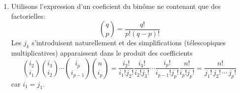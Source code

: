 \begin{enumerate}
\begin{enumerate}
  \item Utilisons l'expression d'un coeficient du binôme ne contenant que des factorielles:
\begin{displaymath}
  \binom{q}{p} = \frac{q!}{p!(q-p)!}
\end{displaymath}
Les $j_k$ s'introduisent naturellement et des simplifications (télescopiques multiplicatives) apparaissent dans le produit des coefficients
\begin{displaymath}
  \binom{i_2}{i_1}\binom{i_3}{i_2}\cdots \binom{i_p}{i_{p-1}}\binom{n}{i_p}
= \frac{i_2!}{i_1!j_2!} \frac{i_3!}{i_2!j_3!} \cdots \frac{i_p!}{i_{p-1}!j_p!} \frac{n!}{i_p!j_p!} 
= \frac{n!}{j_1!\, j_2!\, \cdots \, j_p!}
\end{displaymath}
car $i_1 = j_1$.
\end{enumerate}

\end{enumerate}

